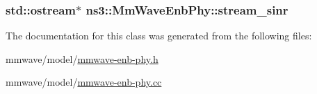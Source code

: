 \subsubsection[{\texorpdfstring{stream\+\_\+sinr}{stream_sinr}}]{\setlength{\rightskip}{0pt plus 5cm}std\+::ostream$\ast$ ns3\+::\+Mm\+Wave\+Enb\+Phy\+::stream\+\_\+sinr\hspace{0.3cm}{\ttfamily [private]}}\hypertarget{classns3_1_1MmWaveEnbPhy_a7295a3929ce0574f3b4bc5db5aa170af}{}\label{classns3_1_1MmWaveEnbPhy_a7295a3929ce0574f3b4bc5db5aa170af}


The documentation for this class was generated from the following files\+:\begin{DoxyCompactItemize}
\item 
mmwave/model/\hyperlink{mmwave-enb-phy_8h}{mmwave-\/enb-\/phy.\+h}\item 
mmwave/model/\hyperlink{mmwave-enb-phy_8cc}{mmwave-\/enb-\/phy.\+cc}\end{DoxyCompactItemize}

